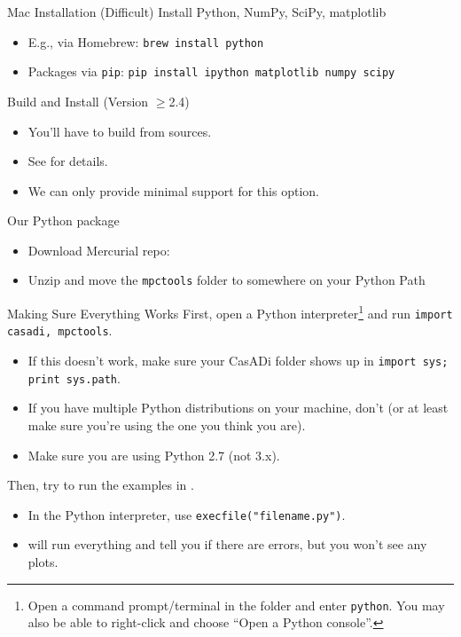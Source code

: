 \documentclass[xcolor=dvipsnames]{beamer}
\begin{document}
\begin{frame}{Mac Installation (Difficult)}
       Install Python, NumPy, SciPy, matplotlib
       \begin{itemize}
           \item E.g., via Homebrew: \lstinline[style=shell]!brew install python!
           \item Packages via \texttt{pip}: \lstinline[style=shell]!pip install ipython matplotlib numpy scipy
           !
        \end{itemize}
        
        \medskip
        
        Build and Install (Version $\ge$2.4)
        \begin{itemize}
            \item You'll have to build from sources.
            \item See  for details.
            \item We can only provide minimal support for this option.
        \end{itemize}
        
        \medskip
        
        Our Python package
        \begin{itemize}
            \item Download Mercurial repo: 
            \item Unzip and move the \texttt{mpctools} folder to somewhere on your Python Path
        \end{itemize}
\end{frame}

\begin{frame}{Making Sure Everything Works}
    First, open a Python interpreter\footnote{Open a command prompt/terminal in the  folder and enter \lstinline[style=shell]!python!. You may also be able to right-click and choose ``Open a Python console''.} and run \lstinline[style=python]!import casadi, mpctools!.
    \begin{itemize}
        \item If this doesn't work, make sure your CasADi folder shows up in \lstinline[style=python]!import sys; print sys.path!.
        \item If you have multiple Python distributions on your machine, don't (or at least make sure you're using the one you think you are).
        \item Make sure you are using Python 2.7 (not 3.x).
    \end{itemize}
        
    Then, try to run the examples in .
    \begin{itemize}
        \item In the Python interpreter, use \lstinline[style=python]!execfile("filename.py")!.
        \item {} will run everything and tell you if there are errors, but you won't see any plots.
    \end{itemize}
\end{frame}
\end{document}
